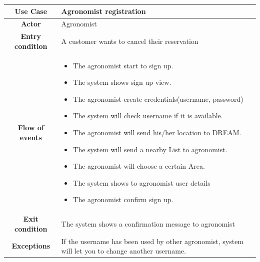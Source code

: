 \documentclass[../../main.tex]{subfiles}
\begin{document}
      \begin{table}[H]
        \centering
          \begin{tabular}{c m{}}
          \hline
          \textbf{Use Case} & Agronomist registration\\ \hline
          \textbf{Actor} & Agronomist\\ \hline
          \textbf{Entry condition} & A customer wants to cancel their reservation\\  \hline
          \textbf{Flow of events} & \begin{itemize}
                                     \item The agronomist start to sign up.
                                      \item The system shows sign up view.
                                      \item The agronomist create credentials(username, password)
                                      \item The system will check username if it is available.
                                      \item The agronomist will send his/her location to DREAM.
                                      \item The system will send a nearby List to agronomist.
                                      \item The agronomist will choose a certain Area.
                                      \item The system shows to agronomist user details
                                      \item The agronomist confirm sign up.
                                    \end{itemize}\\ \hline
          \textbf{Exit condition} & The system shows a confirmation message to agronomist \\ \hline
          \textbf{Exceptions} & If the username has been used by other agronomist, system will let you to change another username.\\ \hline
          \end{tabular}
      \end{table}
\end{document}
